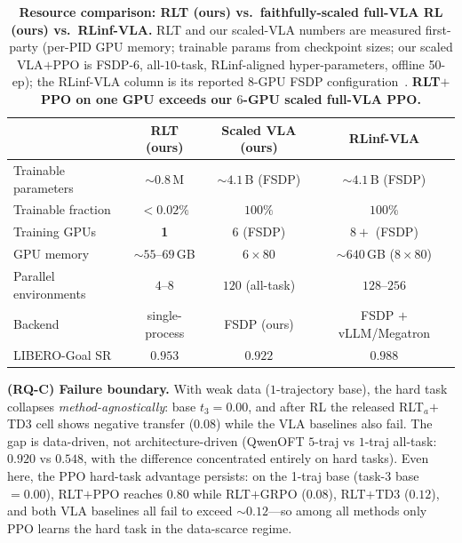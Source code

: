 \documentclass[11pt]{article}
\begin{document}
\begin{table}[t]
    \centering
    \caption{\textbf{Resource comparison: RLT (ours) vs.\ faithfully-scaled full-VLA RL (ours) vs.\ RLinf-VLA.} RLT and our scaled-VLA numbers are measured first-party (per-PID GPU memory; trainable params from checkpoint sizes; our scaled VLA$+$PPO is FSDP-$6$, all-$10$-task, RLinf-aligned hyper-parameters, offline 50-ep); the RLinf-VLA column is its reported $8$-GPU FSDP configuration~\citep{rlinfvla2025}. \textbf{RLT$+$PPO on one GPU exceeds our $6$-GPU scaled full-VLA PPO.}}
    \label{tab:rlt_cost}
    \vspace{0.3em}
    \footnotesize
    \setlength{\tabcolsep}{6pt}
    \renewcommand{\arraystretch}{1.18}
    \begin{tabular}{@{}l ccc@{}}
        \toprule
        & \textbf{RLT (ours)} & \textbf{Scaled VLA (ours)} & \textbf{RLinf-VLA} \\
        \midrule
        Trainable parameters     & $\sim$$0.8$\,M & $\sim$$4.1$\,B (FSDP) & $\sim$$4.1$\,B (FSDP) \\
        Trainable fraction       & $<0.02\%$ & $100\%$ & $100\%$ \\
        Training GPUs            & \textbf{1} & $6$ (FSDP) & $8{+}$ (FSDP) \\
        GPU memory               & $\sim$$55$--$69$\,GB & $6{\times}80$ & $\sim$$640$\,GB ($8{\times}80$) \\
        Parallel environments    & $4$--$8$ & $120$ (all-task) & $128$--$256$ \\
        Backend                  & single-process & FSDP (ours) & FSDP $+$ vLLM/Megatron \\
        \midrule
        LIBERO-Goal SR           & $\mathbf{0.953}$ & $0.922$ & $0.988$ \\
        \bottomrule
    \end{tabular}
\end{table}

\textbf{(RQ-C) Failure boundary.} With weak data ($1$-trajectory base), the hard task collapses \emph{method-agnostically}: base $t_3=0.00$, and after RL the released RLT$_a$$+$TD3 cell shows negative transfer ($0.08$) while the VLA baselines also fail. The gap is data-driven, not architecture-driven (QwenOFT $5$-traj vs $1$-traj all-task: $0.920$ vs $0.548$, with the difference concentrated entirely on hard tasks). Even here, the PPO hard-task advantage persists: on the 1-traj base (task-3 base $=0.00$), RLT$+$PPO reaches $0.80$ while RLT$+$GRPO ($0.08$), RLT$+$TD3 ($0.12$), and both VLA baselines all fail to exceed $\sim0.12$---so among all methods only PPO learns the hard task in the data-scarce regime.
\end{document}
